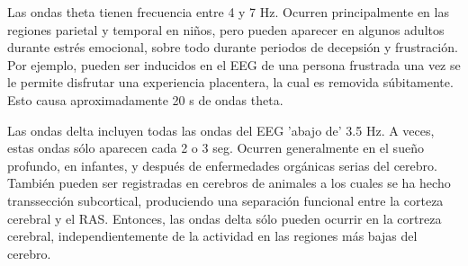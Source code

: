 
Las ondas theta tienen frecuencia entre 4 y 7 Hz. Ocurren principalmente en las regiones
parietal y temporal en ni\~nos, pero pueden aparecer en algunos adultos durante 
estr\'es emocional, sobre todo durante periodos de decepsi\'on y frustraci\'on.
Por ejemplo, pueden ser inducidos en el EEG de una persona frustrada una vez se le permite
disfrutar una experiencia placentera, la cual es removida s\'ubitamente. Esto causa
aproximadamente 20 s de ondas theta.


Las ondas delta incluyen todas las ondas del EEG 'abajo de' 3.5 Hz. A veces, estas ondas s\'olo
aparecen cada 2 o 3 seg. Ocurren generalmente en el sue\~no profundo, en infantes,
y despu\'es de enfermedades org\'anicas serias del cerebro.
Tambi\'en pueden ser registradas en cerebros de animales a los cuales se ha hecho 
transsecci\'on subcortical, produciendo una separaci\'on funcional entre la corteza
cerebral y el RAS. Entonces, las ondas delta s\'olo pueden ocurrir en la cortreza cerebral,
independientemente de la actividad en las regiones m\'as bajas del cerebro.


